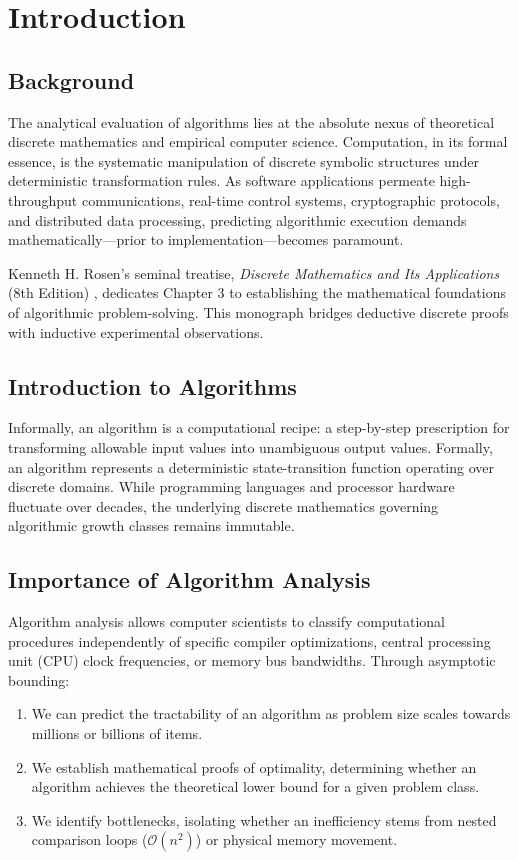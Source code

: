 \chapter{Introduction}
\label{chap:introduction}

\section{Background}
The analytical evaluation of algorithms lies at the absolute nexus of theoretical discrete mathematics and empirical computer science. Computation, in its formal essence, is the systematic manipulation of discrete symbolic structures under deterministic transformation rules. As software applications permeate high-throughput communications, real-time control systems, cryptographic protocols, and distributed data processing, predicting algorithmic execution demands mathematically—prior to implementation—becomes paramount.

Kenneth H. Rosen's seminal treatise, \emph{Discrete Mathematics and Its Applications} (8th Edition) \cite{rosen2019discrete}, dedicates Chapter 3 to establishing the mathematical foundations of algorithmic problem-solving. This monograph bridges deductive discrete proofs with inductive experimental observations.

\section{Introduction to Algorithms}
Informally, an algorithm is a computational recipe: a step-by-step prescription for transforming allowable input values into unambiguous output values. Formally, an algorithm represents a deterministic state-transition function operating over discrete domains. While programming languages and processor hardware fluctuate over decades, the underlying discrete mathematics governing algorithmic growth classes remains immutable.

\section{Importance of Algorithm Analysis}
Algorithm analysis allows computer scientists to classify computational procedures independently of specific compiler optimizations, central processing unit (CPU) clock frequencies, or memory bus bandwidths. Through asymptotic bounding:
\begin{enumerate}
    \item We can predict the tractability of an algorithm as problem size scales towards millions or billions of items.
    \item We establish mathematical proofs of optimality, determining whether an algorithm achieves the theoretical lower bound for a given problem class.
    \item We identify bottlenecks, isolating whether an inefficiency stems from nested comparison loops ($\mathcal{O}(n^2)$) or physical memory movement.
\end{enumerate}

